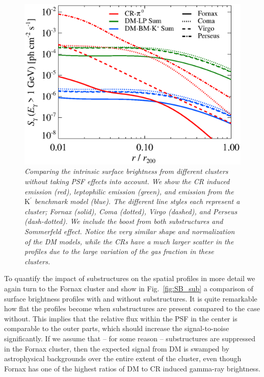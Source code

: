 \documentclass[10pt,aps,pra,reprint,amsmath,amsfonts,amssymb,showpacs,nofootinbib,floatfix]{revtex4-1}
\newcommand{\rmn}{\mathrm}
\newcommand{\Kp}{\rmn{K}^\prime}
\begin{document}
\begin{figure}
 \includegraphics[width=0.99\columnwidth]{figures/SB.v13.1GeV.SF700.SubMass.elmu.eps}
 \caption{\it Comparing the intrinsic surface brightness from
   different clusters without taking PSF effects into account. We show
   the CR induced emission (red), leptophilic emission (green), and
   emission from the $\Kp$ benchmark model (blue). The different line
   styles each represent a cluster; Fornax (solid), Coma (dotted),
   Virgo (dashed), and Perseus (dash-dotted). We include the boost
   from both substructures and Sommerfeld effect. Notice the very
   similar shape and normalization of the DM models, while the CRs
   have a much larger scatter in the profiles due to the large
   variation of the gas fraction in these clusters.}
 \label{fig:SB_clu}
\end{figure}

To quantify the impact of substructures on the spatial profiles in
more detail we again turn to the Fornax cluster and show in
Fig.~\ref{fig:SB_sub} a comparison of surface brightness profiles with
and without substructures. It is quite remarkable how flat the
profiles become when substructures are present compared to the case
without. This implies that the relative flux within the PSF in the
center is comparable to the outer parts, which should increase the
signal-to-noise significantly. If we assume that -- for
some reason -- substructures are suppressed in the Fornax cluster, then the expected
signal from DM is swamped by astrophysical backgrounds over the entire
extent of the cluster, even though Fornax has one of the highest
ratios of DM to CR induced gamma-ray brightness.
\end{document}
